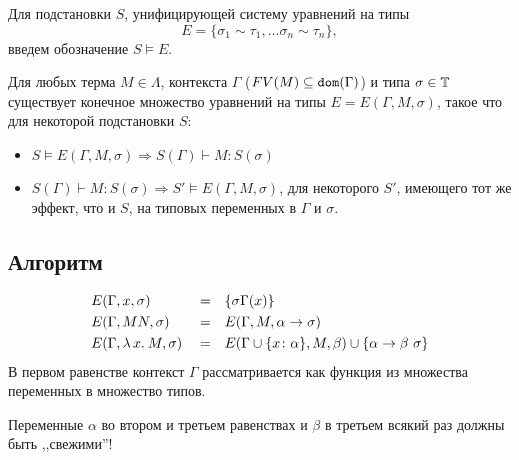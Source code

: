 \documentclass[11pt,a4paper]{article}
\begin{document}
Для подстановки $ S$, унифицирующей систему уравнений на типы
\[
E = \{ \sigma _1 \sim \tau _1, \ldots \sigma _n \sim \tau _n\}
,\] 
введем обозначение $ S \vDash E$.
\begin{thm}
	Для любых терма $ M \in \Lambda$, контекста $ \Gamma $ ($ FV(M) \subseteq \operatorname{\mathtt{dom}}(\Gamma)$) и типа $ \sigma \in \mathbb{T}$ существует конечное множество уравнений на типы $E = E(\Gamma , M, \sigma )$, такое что для некоторой подстановки $ S$:
	\begin{itemize}
		\item
			$ S \vDash E( \Gamma , M, \sigma ) \Longrightarrow S(\Gamma) \vdash M\colon S(\sigma)$ 
		\item $ S(\Gamma) \vdash M \colon S(\sigma) \Longrightarrow S' \vDash E( \Gamma , M, \sigma )$, для некоторого $ S'$, имеющего тот же эффект, что и $ S$, на типовых переменных в $ \Gamma $ и $ \sigma $.
	\end{itemize}
\end{thm}
\subsection{Алгоритм}
\[
\begin{aligned}
	&E(\Gamma, x, \sigma ) &&=&& \{\sigma \Gamma (x)\} \\
	&E( \Gamma , MN, \sigma ) &&=&& E( \Gamma , M, \alpha \to \sigma )\\
	&E( \Gamma , \lambda\,{x}.\:{M}, \sigma ) &&=&& E( \Gamma \cup \{x \colon \alpha \}, M, \beta ) \cup \{ \alpha \to \beta ~ \sigma \}
\end{aligned}
\]
В первом равенстве контекст $ \Gamma$ рассматривается как функция из множества переменных в множество типов.

Переменные $ \alpha $ во втором и третьем равенствах и $ \beta $ в третьем всякий раз должны быть ,,свежими''!
\end{document}
